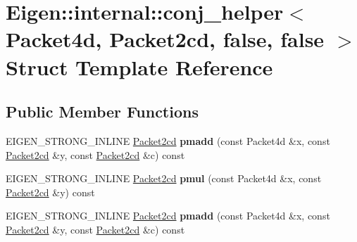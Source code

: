 \hypertarget{struct_eigen_1_1internal_1_1conj__helper_3_01_packet4d_00_01_packet2cd_00_01false_00_01false_01_4}{}\section{Eigen\+:\+:internal\+:\+:conj\+\_\+helper$<$ Packet4d, Packet2cd, false, false $>$ Struct Template Reference}
\label{struct_eigen_1_1internal_1_1conj__helper_3_01_packet4d_00_01_packet2cd_00_01false_00_01false_01_4}
\subsection*{Public Member Functions}
\begin{DoxyCompactItemize}
\item 
\mbox{\label{struct_eigen_1_1internal_1_1conj__helper_3_01_packet4d_00_01_packet2cd_00_01false_00_01false_01_4_a24c4b47811ecc9ee67fc1b54b41221c7}} 
E\+I\+G\+E\+N\+\_\+\+S\+T\+R\+O\+N\+G\+\_\+\+I\+N\+L\+I\+NE \hyperlink{struct_eigen_1_1internal_1_1_packet2cd}{Packet2cd} {\bfseries pmadd} (const Packet4d \&x, const \hyperlink{struct_eigen_1_1internal_1_1_packet2cd}{Packet2cd} \&y, const \hyperlink{struct_eigen_1_1internal_1_1_packet2cd}{Packet2cd} \&c) const
\item 
\mbox{\label{struct_eigen_1_1internal_1_1conj__helper_3_01_packet4d_00_01_packet2cd_00_01false_00_01false_01_4_a377815e196ab154f2e465b945ffd5aea}} 
E\+I\+G\+E\+N\+\_\+\+S\+T\+R\+O\+N\+G\+\_\+\+I\+N\+L\+I\+NE \hyperlink{struct_eigen_1_1internal_1_1_packet2cd}{Packet2cd} {\bfseries pmul} (const Packet4d \&x, const \hyperlink{struct_eigen_1_1internal_1_1_packet2cd}{Packet2cd} \&y) const
\item 
\mbox{\label{struct_eigen_1_1internal_1_1conj__helper_3_01_packet4d_00_01_packet2cd_00_01false_00_01false_01_4_a24c4b47811ecc9ee67fc1b54b41221c7}} 
E\+I\+G\+E\+N\+\_\+\+S\+T\+R\+O\+N\+G\+\_\+\+I\+N\+L\+I\+NE \hyperlink{struct_eigen_1_1internal_1_1_packet2cd}{Packet2cd} {\bfseries pmadd} (const Packet4d \&x, const \hyperlink{struct_eigen_1_1internal_1_1_packet2cd}{Packet2cd} \&y, const \hyperlink{struct_eigen_1_1internal_1_1_packet2cd}{Packet2cd} \&c) const

\end{DoxyCompactItemize}
